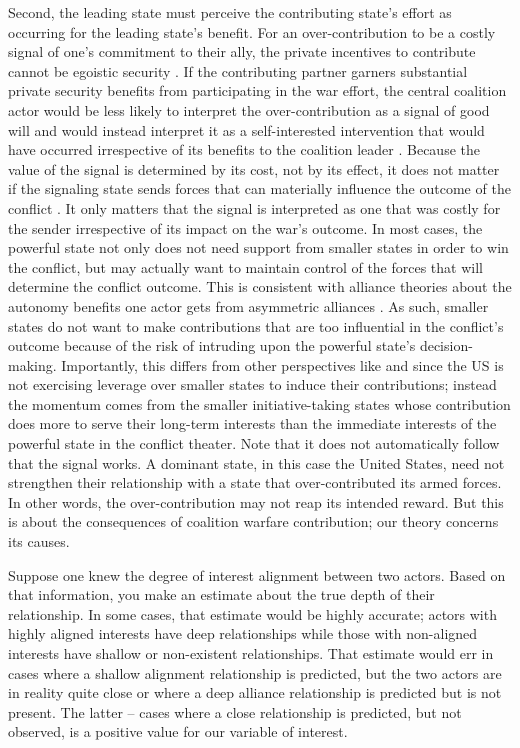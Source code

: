 \documentclass[12pt,letterpaper]{article}
\begin{document}
		Second, the leading state must perceive the contributing state's effort as occurring for the leading state's benefit. For an over-contribution to be a costly signal of one's commitment to their ally, the private incentives to contribute cannot be egoistic security \citep{davidson_americaallieswar_2011}. If the contributing partner garners substantial private security benefits from participating in the war effort, the central coalition actor would be less likely to interpret the over-contribution as a signal of good will and would instead interpret it as a self-interested intervention that would have occurred irrespective of its benefits to the coalition leader \citep{tago_whystatesjoin_2007, lake_hierarchyinternationalrelations_2009, chapman_securingapprovaldomestic_2011}. Because the value of the signal is determined by its cost, not by its effect, it does not matter if the signaling state sends forces that can materially influence the outcome of the conflict \citep{davidson_americaallieswar_2011}. It only matters that the signal is interpreted as one that was costly for the sender irrespective of its impact on the war's outcome. In most cases, the powerful state not only does not need support from smaller states in order to win the conflict, but may actually want to maintain control of the forces that will determine the conflict outcome. This is consistent with alliance theories about the autonomy benefits one actor gets from asymmetric alliances \citep{morrow_alliancesasymmetryalternative_1991}. As such, smaller states do not want to make contributions that are too influential in the conflict's outcome because of the risk of intruding upon the powerful state's decision-making. Importantly, this differs from other perspectives like \citet[72-75]{bennett_burdensharingpersiangulf_1994} and \citet{henke_buyingalliespayment_2019} since the US is not exercising leverage over smaller states to induce their contributions; instead the momentum comes from the smaller initiative-taking states whose contribution does more to serve their long-term interests than the immediate interests of the powerful state in the conflict theater. Note that it does not automatically follow that the signal works. A dominant state, in this case the United States, need not strengthen their relationship with a state that over-contributed its armed forces. In other words, the over-contribution may not reap its intended reward. But this is about the consequences of coalition warfare contribution; our theory concerns its causes.

		Suppose one knew the degree of interest alignment between two actors. Based on that information, you make an estimate about the true depth of their relationship. In some cases, that estimate would be highly accurate; actors with highly aligned interests have deep relationships while those with non-aligned interests have shallow or non-existent relationships. That estimate would err in cases where a shallow alignment relationship is predicted, but the two actors are in reality quite close or where a deep alliance relationship is predicted but is not present. The latter -- cases where a close relationship is predicted, but not observed, is a positive value for our variable of interest.
\end{document}
